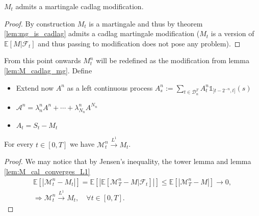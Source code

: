 \begin{lemma}\label{lem:M_cadlag_mg}
  $M_t$ admits a martingale cadlag modification.
\end{lemma}
\begin{proof}
  By construction $M_t$ is a martingale and thus by theorem \ref{lem:mg_is_cadlag} admits a cadlag martingale modification
  ($M_t$ is a version of $\mathbb{E}[M\vert\mathcal{F}_t]$ and thus passing to modification does not pose any problem).
\end{proof}

From this point onwards $M^n_t$ will be redefined as the modification from lemma \ref{lem:M_cadlag_mg}.
Define
\begin{itemize}
  \item Extend now $A^n$ as a left continuous process $A^n_s:=\sum_{t\in\mathcal{D}^T_n}A^n_t\mathbb{1}_{]t-2^{-n},t]}(s)$
  \item $\mathcal{A}^n=\lambda^n_nA^n+\cdots +\lambda^n_{N_n}A^{N_n}$
  \item $A_t=S_t-M_t$
\end{itemize}

\begin{lemma}\label{lem:M1_komlos}
  For every $t\in[0,T]$ we have $\mathcal{M}^n_t\stackrel{L^1}{\rightarrow}M_t$.
\end{lemma}
\begin{proof}
  We may notice that by Jensen's inequality, the tower lemma and lemma \ref{lem:M_cal_converges_L1}
  \begin{gather}\nonumber
    \mathbb{E}[|\mathcal{M}^n_t-M_t|]=\mathbb{E}[|\mathbb{E}[\mathcal{M}^n_T-M\vert\mathcal{F}_t]|]\leq \mathbb{E}[|\mathcal{M}^n_T-M|]\rightarrow0,\\
    \Rightarrow\mathcal{M}^n_t\stackrel{L^1}{\rightarrow} M_t,\quad \forall t\in[0,T].\label{equation_DM_e7}
  \end{gather}
\end{proof}

